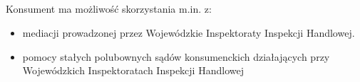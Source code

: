 \subsection{} Konsument ma możliwość skorzystania m.in. z:
				\begin{itemize}
					\item  mediacji prowadzonej przez Wojewódzkie Inspektoraty Inspekcji Handlowej.
					\item  pomocy stałych polubownych sądów konsumenckich działających przy Wojewódzkich Inspektoratach Inspekcji Handlowej
				\end{itemize} 
